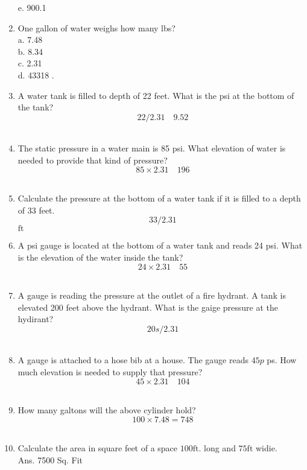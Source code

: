 \begin{enumerate}
e. 900.1\\
\item One gallon of water weighs how many lbs?\\
a. 7.48\\
b. 8.34\\
c. 2.31\\
d. 43318 .\\
\item A water tank is filled to depth of 22 feet. What is the psi at the bottom of the tank?\\
$$
22 / 2.31 \quad 9.52
$$\\
\item The static pressure in a water main is 85 psi. What elevation of water is needed to provide that kind of pressure?\\
$$
85 \times 2.31 \quad 196
$$\\
\item Calculate the pressure at the bottom of a water tank if it is filled to a depth of 33 feet.\\
$$
33 / 2.31
$$
$\mathrm{ft}$\\
\item A psi gauge is located at the bottom of a water tank and reads 24 psi. What is the elevation of the water inside the tank?\\
$$
24 \times 2.31 \quad 55
$$\\
\item A gauge is reading the pressure at the outlet of a fire hydrant. A tank is elevated 200 feet above the hydrant. What is the gaige pressure at the hydirant?\\
$$
20 s / 2.31
$$\\
\item A gauge is attached to a hose bib at a house. The gauge reads $45 p$ ps. How much elevation is needed to supply that pressure?\\
$$
45 \times 2.31 \quad 104
$$\\
\item How many galtons will the above cylinder hold?\\
$$
100 \times 7.48=748
$$\\
\item Calculate the area in square feet of a space $100 \mathrm{ft}$. long and $75 \mathrm{ft}$ widie.\\
Ans. 7500 Sq. Fit\\


\end{enumerate}
